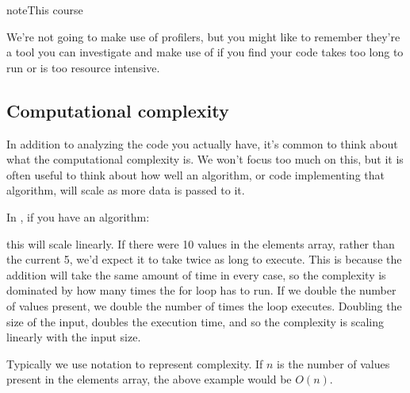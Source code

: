 \documentclass[letterpaper,10pt,british]{sphinxmanual}
\begin{document}
\begin{sphinxadmonition}{note}{This course}

\sphinxAtStartPar
We’re not going to make use of profilers, but you might like to remember they’re a tool you can investigate and make use of if you find your code takes too long to run or is too resource intensive.
\end{sphinxadmonition}


\subsection{Computational complexity}
\label{\detokenize{chapters/software_development_tools/profiler:computational-complexity}}
\sphinxAtStartPar
In addition to analyzing the code you actually have, it’s common to think  about what the computational complexity is. We won’t focus too much on this, but it is often useful to think about how well an algorithm, or code implementing that algorithm, will scale as more data is passed to it.

\sphinxAtStartPar
In {\hyperref[\detokenize{chapters/software_development_tools/pseudocode:pseudocode}]{}}, if you have an algorithm:

\begin{sphinxVerbatim}[commandchars=\\\{\}]
  
  \PYG{p}{[}    \PYG{p}{]}
    
        
\end{sphinxVerbatim}

\sphinxAtStartPar
this will scale linearly. If there were 10 values in the elements array, rather than the current 5, we’d expect it to take twice as long to execute. This is because the addition will take the same amount of time in every case, so the complexity is dominated by how many times the for loop has to run. If we double the number of values present, we double the number of times the loop executes. Doubling the size of the input, doubles the execution time, and so the complexity is scaling linearly with the input size.

\sphinxAtStartPar
Typically we use  notation to represent complexity. If \(n\) is the number of values present in the elements array, the above example would be \(O(n)\).
\end{document}
